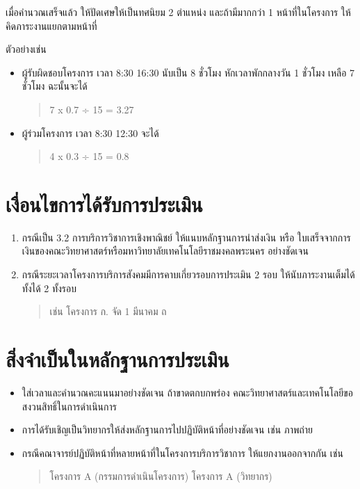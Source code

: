 \documentclass[a4paper,12pt,english]{sphinxmanual}
\begin{document}
เมื่อคำนวณเสร็จแล้ว ให้ปัดเศษให้เป็นทศนิยม 2 ตำแหน่ง และถ้ามีมากกว่า 1 หน้าที่ในโครงการ ให้คิดภาระงานแยกตามหน้าที่

ตัวอย่างเช่น
\begin{itemize}
\item {} 
ผู้รับผิดชอบโครงการ เวลา 8:30 \sphinxhyphen{} 16:30 นับเป็น 8 ชั่วโมง หักเวลาพักกลางวัน 1 ชั่วโมง เหลือ 7 ชั่วโมง ฉะนั้นจะได้
\begin{quote}

7 x 0.7 ÷ 15 = 3.27
\end{quote}

\item {} 
ผู้ร่วมโครงการ เวลา 8:30 \sphinxhyphen{} 12:30 จะได้
\begin{quote}

4 x 0.3 ÷ 15 = 0.8
\end{quote}

\end{itemize}


\section{เงื่อนไขการได้รับการประเมิน}
\label{\detokenize{3service:id3}}\begin{enumerate}
%
\item {} 
กรณีเป็น 3.2 การบริการวิชาการเชิงพาณิชย์ ให้แนบหลักฐานการนำส่งเงิน หรือ ใบเสร็จจากการเงินของคณะวิทยาศาสตร์หรือมหาวิทยาลัยเทคโนโลยีราชมงคลพระนคร อย่างชัดเจน

\item {} 
กรณีระยะเวลาโครงการบริการสังคมมีการคาบเกี่ยวรอบการประเมิน 2 รอบ ให้นับภาระงานเต็มได้ทั้งได้ 2 ทั้งรอบ
\begin{quote}

เช่น โครงการ ก. จัด 1 มีนาคม ถ
\end{quote}

\end{enumerate}


\section{สิ่งจำเป็นในหลักฐานการประเมิน}
\label{\detokenize{3service:id4}}\begin{itemize}
\item {} 
 ใส่เวลาและคำนวณคะแนนมาอย่างชัดเจน ถ้าขาดตกบกพร่อง คณะวิทยาศาสตร์และเทคโนโลยีขอสงวนสิทธิ์ในการดำเนินการ

\item {} 
การได้รับเชิญเป็นวิทยากรให้ส่งหลักฐานการไปปฏิบัติหน้าที่อย่างชัดเจน เช่น ภาพถ่าย

\item {} 
กรณีคณาจารย์ปฏิบัติหน้าที่หลายหน้าที่ในโครงการบริการวิชาการ ให้แยกงานออกจากกัน เช่น
\begin{quote}

โครงการ A (กรรมการดำเนินโครงการ)
โครงการ A (วิทยากร)
\end{quote}

\end{itemize}
\end{document}
